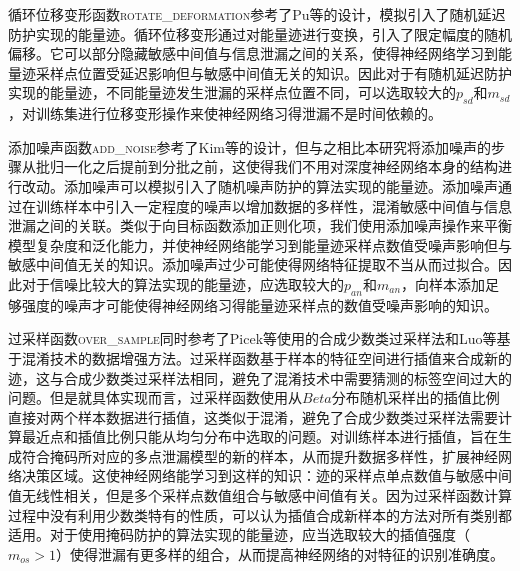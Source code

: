 {	循环位移变形函数\textsc{rotate\_deformation}参考了Pu等\citep{Pu17}的设计，模拟引入了随机延迟防护实现的能量迹。循环位移变形通过对能量迹进行变换，引入了限定幅度的随机偏移。它可以部分隐藏敏感中间值与信息泄漏之间的关系，使得神经网络学习到能量迹采样点位置受延迟影响但与敏感中间值无关的知识。因此对于有随机延迟防护实现的能量迹，不同能量迹发生泄漏的采样点位置不同，可以选取较大的$p_{sd}$和$m_{sd}$，对训练集进行位移变形操作来使神经网络习得泄漏不是时间依赖的。
	
	添加噪声函数\textsc{add\_noise}参考了Kim等\citep{Kim19}的设计，但与之相比本研究将添加噪声的步骤从批归一化之后提前到分批之前，这使得我们不用对深度神经网络本身的结构进行改动。添加噪声可以模拟引入了随机噪声防护的算法实现的能量迹。添加噪声通过在训练样本中引入一定程度的噪声以增加数据的多样性，混淆敏感中间值与信息泄漏之间的关联。类似于向目标函数添加正则化项，我们使用添加噪声操作来平衡模型复杂度和泛化能力，并使神经网络能学习到能量迹采样点数值受噪声影响但与敏感中间值无关的知识。添加噪声过少可能使得网络特征提取不当从而过拟合。因此对于信噪比较大的算法实现的能量迹，应选取较大的$p_{an}$和$m_{an}$，向样本添加足够强度的噪声才可能使得神经网络习得能量迹采样点的数值受噪声影响的知识。
	
	过采样函数\textsc{over\_sample}同时参考了Picek等\citep{Picek19}使用的合成少数类过采样法和Luo等\citep{Luo21}基于混淆技术的数据增强方法。过采样函数基于样本的特征空间进行插值来合成新的迹，这与合成少数类过采样法相同，避免了混淆技术中需要猜测的标签空间过大的问题。但是就具体实现而言，过采样函数使用从$Beta$分布随机采样出的插值比例直接对两个样本数据进行插值，这类似于混淆，避免了合成少数类过采样法需要计算最近点和插值比例只能从均匀分布中选取的问题。对训练样本进行插值，旨在生成符合掩码所对应的多点泄漏模型的新的样本，从而提升数据多样性，扩展神经网络决策区域。这使神经网络能学习到这样的知识：迹的采样点单点数值与敏感中间值无线性相关，但是多个采样点数值组合与敏感中间值有关。因为过采样函数计算过程中没有利用少数类特有的性质，可以认为插值合成新样本的方法对所有类别都适用。对于使用掩码防护的算法实现的能量迹，应当选取较大的插值强度（$m_{os}>1$）使得泄漏有更多样的组合，从而提高神经网络的对特征的识别准确度。
	
}
